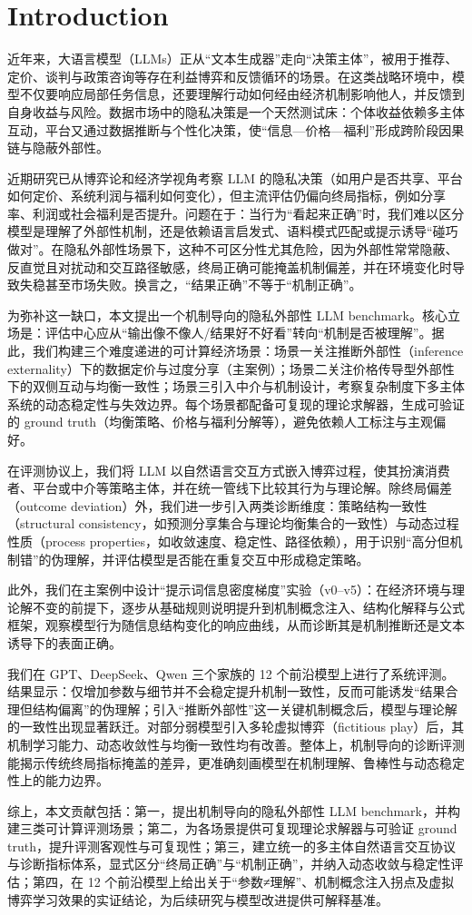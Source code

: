 ﻿\section{Introduction}
近年来，大语言模型（LLMs）正从“文本生成器”走向“决策主体”，被用于推荐、定价、谈判与政策咨询等存在利益博弈和反馈循环的场景。在这类战略环境中，模型不仅要响应局部任务信息，还要理解行动如何经由经济机制影响他人，并反馈到自身收益与风险。数据市场中的隐私决策是一个天然测试床：个体收益依赖多主体互动，平台又通过数据推断与个性化决策，使“信息—价格—福利”形成跨阶段因果链与隐蔽外部性。

近期研究已从博弈论和经济学视角考察 LLM 的隐私决策（如用户是否共享、平台如何定价、系统利润与福利如何变化），但主流评估仍偏向终局指标，例如分享率、利润或社会福利是否提升。问题在于：当行为“看起来正确”时，我们难以区分模型是理解了外部性机制，还是依赖语言启发式、语料模式匹配或提示诱导“碰巧做对”。在隐私外部性场景下，这种不可区分性尤其危险，因为外部性常常隐蔽、反直觉且对扰动和交互路径敏感，终局正确可能掩盖机制偏差，并在环境变化时导致失稳甚至市场失败。换言之，“结果正确”不等于“机制正确”。

为弥补这一缺口，本文提出一个机制导向的隐私外部性 LLM benchmark。核心立场是：评估中心应从“输出像不像人/结果好不好看”转向“机制是否被理解”。据此，我们构建三个难度递进的可计算经济场景：场景一关注推断外部性（inference externality）下的数据定价与过度分享（主案例）；场景二关注价格传导型外部性下的双侧互动与均衡一致性；场景三引入中介与机制设计，考察复杂制度下多主体系统的动态稳定性与失效边界。每个场景都配备可复现的理论求解器，生成可验证的 ground truth（均衡策略、价格与福利分解等），避免依赖人工标注与主观偏好。

在评测协议上，我们将 LLM 以自然语言交互方式嵌入博弈过程，使其扮演消费者、平台或中介等策略主体，并在统一管线下比较其行为与理论解。除终局偏差（outcome deviation）外，我们进一步引入两类诊断维度：策略结构一致性（structural consistency，如预测分享集合与理论均衡集合的一致性）与动态过程性质（process properties，如收敛速度、稳定性、路径依赖），用于识别“高分但机制错”的伪理解，并评估模型是否能在重复交互中形成稳定策略。

此外，我们在主案例中设计“提示词信息密度梯度”实验（v0–v5）：在经济环境与理论解不变的前提下，逐步从基础规则说明提升到机制概念注入、结构化解释与公式框架，观察模型行为随信息结构变化的响应曲线，从而诊断其是机制推断还是文本诱导下的表面正确。

我们在 GPT、DeepSeek、Qwen 三个家族的 12 个前沿模型上进行了系统评测。结果显示：仅增加参数与细节并不会稳定提升机制一致性，反而可能诱发“结果合理但结构偏离”的伪理解；引入“推断外部性”这一关键机制概念后，模型与理论解的一致性出现显著跃迁。对部分弱模型引入多轮虚拟博弈（fictitious play）后，其机制学习能力、动态收敛性与均衡一致性均有改善。整体上，机制导向的诊断评测能揭示传统终局指标掩盖的差异，更准确刻画模型在机制理解、鲁棒性与动态稳定性上的能力边界。

综上，本文贡献包括：第一，提出机制导向的隐私外部性 LLM benchmark，并构建三类可计算评测场景；第二，为各场景提供可复现理论求解器与可验证 ground truth，提升评测客观性与可复现性；第三，建立统一的多主体自然语言交互协议与诊断指标体系，显式区分“终局正确”与“机制正确”，并纳入动态收敛与稳定性评估；第四，在 12 个前沿模型上给出关于“参数≠理解”、机制概念注入拐点及虚拟博弈学习效果的实证结论，为后续研究与模型改进提供可解释基准。

